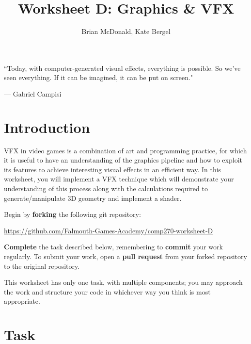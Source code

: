 \documentclass{../../../fal_assignment}
\title{Worksheet D: Graphics \& VFX}
\author{Brian McDonald, Kate Bergel}
\begin{document}
\maketitle

\begin{marginquote}
``Today, with computer-generated visual effects, everything is possible. So we've seen everything. If it can be imagined, it can be put on screen."

\par --- Gabriel Campisi
\end{marginquote}

\section*{Introduction}

VFX in video games is a combination of art and programming practice, for which it is useful to have an understanding of the graphics pipeline and how to exploit its features to achieve interesting visual effects in an efficient way. In this worksheet, you will implement a VFX technique which will demonstrate your understanding of this process along with the calculations required to generate/manipulate 3D geometry and implement a shader.

Begin by \textbf{forking} the following git repository:

\begin{center}
	\url{https://github.com/Falmouth-Games-Academy/comp270-worksheet-D}
\end{center}

\textbf{Complete} the task described below, remembering to \textbf{commit} your work regularly.
To submit your work, open a \textbf{pull request} from your forked repository to the original repository.

This worksheet has only one task, with multiple components; you may approach the work and structure your code in whichever way you think is most appropriate.

\section*{Task}

\end{document}
